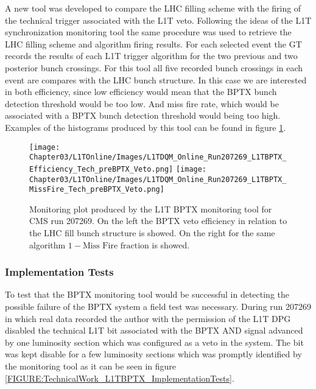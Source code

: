 A new tool was developed to compare the \gls{LHC} filling scheme with the firing of the technical trigger associated with the \gls{L1T} veto. Following the ideas of the \gls{L1T} synchronization monitoring tool the same procedure was used to retrieve the \gls{LHC} filling scheme and algorithm firing results. For each selected event the \gls{GT} records the results of each \gls{L1T} trigger algorithm for the two previous and two posterior bunch crossings. For this tool all five recorded bunch crossings in each event are compares with the \gls{LHC} bunch structure. In this case we are interested in both efficiency, since low efficiency would mean that the \gls{BPTX} bunch detection threshold would be too low. And miss fire rate, which would be associated with a \gls{BPTX} bunch detection threshold would being too high. Examples of the histograms produced by this tool can be found in figure \ref{FIGURE:TechnicalWork_BPTXMonitoring}.

\begin{figure}[!htb]
\centering
\texttt{[image: Chapter03/L1TOnline/Images/L1TDQM\_Online\_Run207269\_L1TBPTX\_Efficiency\_Tech\_preBPTX\_Veto.png]}
\texttt{[image: Chapter03/L1TOnline/Images/L1TDQM\_Online\_Run207269\_L1TBPTX\_MissFire\_Tech\_preBPTX\_Veto.png]}
\caption{Monitoring plot produced by the \gls{L1T} \gls{BPTX} monitoring tool for \gls{CMS} run 207269. On the left the \gls{BPTX} veto efficiency in relation to the \gls{LHC} fill bunch structure is showed. On the right for the same algorithm $1 - \text{Miss Fire fraction}$ is showed.}
\label{FIGURE:TechnicalWork_BPTXMonitoring}
\end{figure}

\subsubsection{Implementation Tests}


To test that the \gls{BPTX} monitoring tool would be successful in detecting the possible failure of the \gls{BPTX} system a field test was necessary. During run 207269 in which real data recorded the author with the permission of the \gls{L1T} \gls{DPG} disabled the technical \gls{L1T} bit associated with the \gls{BPTX} AND signal advanced by one luminosity section which was configured as a veto in the system. The bit was kept disable for a few luminosity sections which was promptly identified by the monitoring tool as it can be seen in figure \ref{FIGURE:TechnicalWork_L1TBPTX_ImplementationTests}.

